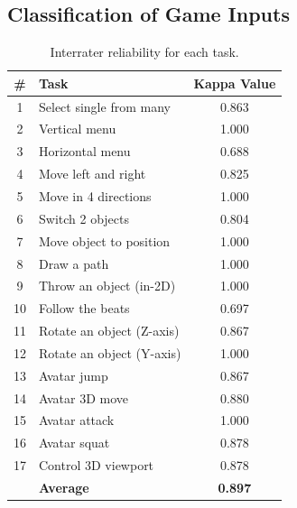 \documentclass{sigchi}
\newcommand\tabhead[1]{\small\textbf{#1}}
\begin{document}
  \subsection{Classification of Game Inputs}

   \begin{table}
    \centering
    \begin{tabular}{|c|l|c|}
      \hline
      \tabhead{\#} &
      \multicolumn{1}{|p{0.4\columnwidth}|}{\centering\tabhead{Task}} &
      \multicolumn{1}{|p{0.2\columnwidth}|}{\centering\tabhead{Kappa Value}} \\
      \hline
      1 & Select single from many& 0.863\\
      \hline
      2 & Vertical menu & 1.000\\
      \hline
      3 & Horizontal menu & 0.688\\
      \hline
      4 & Move left and right & 0.825\\
      \hline
      5 & Move in 4 directions & 1.000\\
      \hline
      6 & Switch 2 objects & 0.804\\
      \hline
      7 & Move object to position & 1.000\\
      \hline
      8 & Draw a path & 1.000\\
      \hline
      9 & Throw an object (in-2D) & 1.000\\
      \hline
      10 & Follow the beats & 0.697\\
      \hline
      11 & Rotate an object (Z-axis) & 0.867 \\
      \hline
      12 & Rotate an object (Y-axis) & 1.000\\
      \hline
      13 & Avatar jump & 0.867\\
      \hline
      14 & Avatar 3D move & 0.880\\
      \hline
      15 & Avatar attack & 1.000\\
      \hline
      16 & Avatar squat & 0.878\\
      \hline
      17 & Control 3D viewport  & 0.878\\
      \hline
      & \bf{Average} & \bf{0.897}\\
      \hline

    \end{tabular}
    \caption{Interrater reliability for each task.}
    \label{tab:kappa}
  \end{table}
\end{document}
